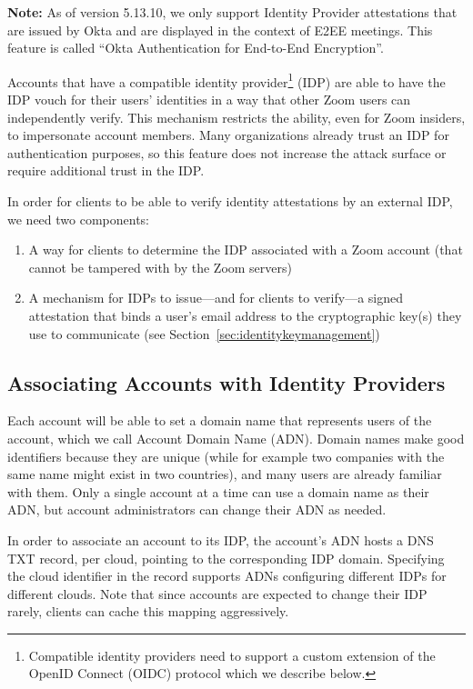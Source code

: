 \textbf{Note:} As of version 5.13.10, we only support Identity Provider
attestations that are issued by Okta and are displayed in the context of E2EE meetings.
This feature is called ``Okta Authentication for End-to-End Encryption''.

Accounts that have a compatible identity provider\footnote{Compatible
identity providers need to support a custom extension of the OpenID Connect
(OIDC) protocol which we describe below.} (IDP) are able to have the IDP vouch
for their users' identities in a way that other Zoom users can independently
verify. This mechanism restricts the ability, even for Zoom insiders, to
impersonate account members. Many organizations already trust an IDP for
authentication purposes, so this feature does not increase the attack surface or
require additional trust in the IDP.

In order for clients to be able to verify identity attestations by an external IDP, we need two
components:

\begin{enumerate}
\item A way for clients to determine the IDP associated with a Zoom account (that cannot be
    tampered with by the Zoom servers)
\item A mechanism for IDPs to issue---and for clients to verify---a signed attestation that binds
    a user's email address to the cryptographic key(s) they use to communicate (see Section~\ref{sec:identitykeymanagement})
\end{enumerate}

\subsection{Associating Accounts with Identity Providers}
\label{subsec:adnToIdp}
Each account will be able to set a domain name that represents users of the account, which we call
Account Domain Name (ADN). Domain names make good identifiers because they are unique (while for
example two companies with the same name might exist in two countries), and many users are already
familiar with them. Only a single account at a time can use a domain name as their ADN, but account
administrators can change their ADN as needed.

In order to associate an account to its IDP, the account's ADN hosts a DNS
TXT record, per cloud, pointing to the corresponding IDP domain. Specifying the
cloud identifier in the record supports ADNs configuring different IDPs for
different clouds. Note that since accounts are expected to change their IDP
rarely, clients can cache this mapping aggressively.

